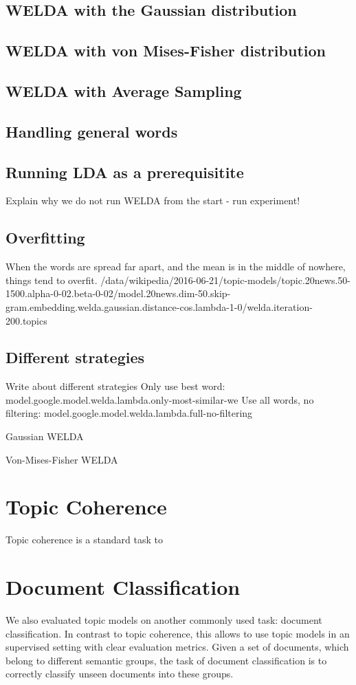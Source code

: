 \documentclass[
        a4paper,
        titlepage,
        twoside,
        parskip
        ]{scrbook}
\theoremstyle{break}
\begin{document}
\subsection{WELDA with the Gaussian distribution}
\subsection{WELDA with von Mises-Fisher distribution}
\subsection{WELDA with Average Sampling}
\subsection{Handling general words}
\subsection{Running LDA as a prerequisitite}
Explain why we do not run WELDA from the start - run experiment!
\subsection{Overfitting}
When the words are spread far apart, and the mean is in the middle of nowhere, things tend to overfit.
/data/wikipedia/2016-06-21/topic-models/topic.20news.50-1500.alpha-0-02.beta-0-02/model.20news.dim-50.skip-gram.embedding.welda.gaussian.distance-cos.lambda-1-0/welda.iteration-200.topics


\subsection{Different strategies}
Write about different strategies
Only use best word:
model.google.model.welda.lambda.only-most-similar-we
Use all words, no filtering:
model.google.model.welda.lambda.full-no-filtering

Gaussian WELDA

Von-Mises-Fisher WELDA

\section{Topic Coherence}
Topic coherence is a standard task to

\section{Document Classification}
We also evaluated topic models on another commonly used task: document classification.
In contrast to topic coherence, this allows to use topic models in an supervised setting with clear evaluation metrics.
Given a set of documents, which belong to different semantic groups, the task of document classification is to correctly classify unseen documents into these groups.
\end{document}
